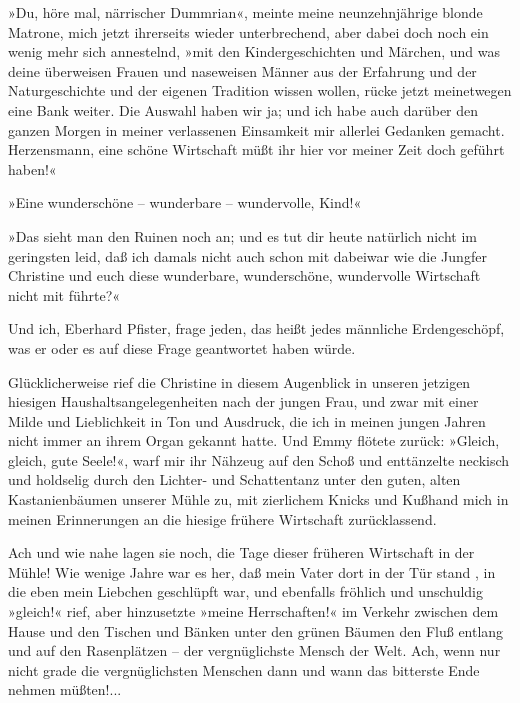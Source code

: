 »Du, höre mal, närrischer Dummrian«, meinte meine neunzehnjährige
blonde Matrone, mich jetzt ihrerseits wieder unterbrechend, aber
dabei doch noch ein wenig mehr sich annestelnd, »mit den
Kindergeschichten und Märchen, und was deine überweisen Frauen und
naseweisen Männer aus der Erfahrung und der Naturgeschichte und der
eigenen Tradition wissen wollen, rücke jetzt meinetwegen eine Bank
weiter. Die Auswahl haben wir ja; und ich habe auch darüber den
ganzen Morgen in meiner verlassenen Einsamkeit mir allerlei
Gedanken gemacht. Herzensmann, eine schöne Wirtschaft müßt ihr hier
vor meiner Zeit doch geführt haben!«

»Eine wunderschöne – wunderbare – wundervolle, Kind!«

»Das sieht man den Ruinen noch an; und es tut dir heute natürlich
nicht im geringsten leid, daß ich damals nicht auch schon mit
dabeiwar wie die Jungfer Christine und euch diese wunderbare,
wunderschöne, wundervolle Wirtschaft nicht mit führte?«

Und ich, Eberhard Pfister, frage jeden, das heißt jedes männliche
Erdengeschöpf, was er oder es auf diese Frage geantwortet haben
würde.

Glücklicherweise rief die Christine in diesem Augenblick in unseren
jetzigen hiesigen Haushaltsangelegenheiten nach der jungen Frau,
und zwar mit einer Milde und Lieblichkeit in Ton und Ausdruck, die
ich in meinen jungen Jahren nicht immer an ihrem Organ gekannt
hatte. Und Emmy flötete zurück: »Gleich, gleich, gute Seele!«, warf
mir ihr Nähzeug auf den Schoß und enttänzelte neckisch und
holdselig durch den Lichter- und Schattentanz unter den guten,
alten Kastanienbäumen unserer Mühle zu, mit zierlichem Knicks und
Kußhand mich in meinen Erinnerungen an die hiesige frühere
Wirtschaft zurücklassend.

Ach und wie nahe lagen sie noch, die Tage dieser früheren
Wirtschaft in der Mühle! Wie wenige Jahre war es her, daß mein
Vater dort in der Tür stand , in die eben mein Liebchen geschlüpft
war, und ebenfalls fröhlich und unschuldig »gleich!« rief, aber
hinzusetzte »meine Herrschaften!« im Verkehr zwischen dem Hause und
den Tischen und Bänken unter den grünen Bäumen den Fluß entlang und
auf den Rasenplätzen – der vergnüglichste Mensch der Welt. Ach,
wenn nur nicht grade die vergnüglichsten Menschen dann und wann das
bitterste Ende nehmen müßten!...

